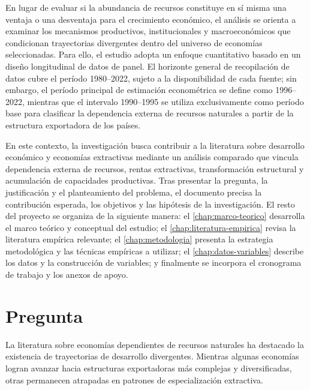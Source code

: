 \documentclass[../../PTFM.tex]{subfiles}
\begin{document}
	En lugar de evaluar si la abundancia de recursos constituye en sí misma una ventaja o una desventaja para el crecimiento económico, el análisis se orienta a examinar los mecanismos productivos, institucionales y macroeconómicos que condicionan trayectorias divergentes dentro del universo de economías seleccionadas. Para ello, el estudio adopta un enfoque cuantitativo basado en un diseño longitudinal de datos de panel. El horizonte general de recopilación de datos cubre el período 1980--2022, sujeto a la disponibilidad de cada fuente; sin embargo, el período principal de estimación econométrica se define como 1996--2022, mientras que el intervalo 1990--1995 se utiliza exclusivamente como período base para clasificar la dependencia externa de recursos naturales a partir de la estructura exportadora de los países.

	En este contexto, la investigación busca contribuir a la literatura sobre desarrollo económico y economías extractivas mediante un análisis comparado que vincula dependencia externa de recursos, rentas extractivas, transformación estructural y acumulación de capacidades productivas. Tras presentar la pregunta, la justificación y el planteamiento del problema, el documento precisa la contribución esperada, los objetivos y las hipótesis de la investigación. El resto del proyecto se organiza de la siguiente manera: el \autoref{chap:marco-teorico} desarrolla el marco teórico y conceptual del estudio; el \autoref{chap:literatura-empirica} revisa la literatura empírica relevante; el \autoref{chap:metodologia} presenta la estrategia metodológica y las técnicas empíricas a utilizar; el \autoref{chap:datos-variables} describe los datos y la construcción de variables; y finalmente se incorpora el cronograma de trabajo y los anexos de apoyo.

	\chapter{Pregunta}
	\label{chap:pregunta}

	La literatura sobre economías dependientes de recursos naturales ha destacado la existencia de trayectorias de desarrollo divergentes. Mientras algunas economías logran avanzar hacia estructuras exportadoras más complejas y diversificadas, otras permanecen atrapadas en patrones de especialización extractiva.
\end{document}
